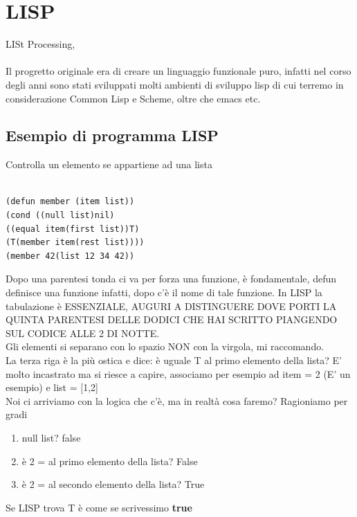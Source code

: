 \documentclass[12pt, a4paper, openany, oneside]{book}
\begin{document}
{\section{LISP}
LISt Processing, \\ \\
Il progretto originale era di creare un linguaggio funzionale puro, infatti
nel corso degli anni sono stati sviluppati molti ambienti di sviluppo lisp
di cui terremo in considerazione Common Lisp e Scheme, oltre che emacs etc.
\subsection{Esempio di programma LISP}
Controlla un elemento se appartiene ad una lista \\ \\
\begin{lstlisting}[language=LISP]
(defun member (item list)) 
(cond ((null list)nil) 
((equal item(first list))T) 
(T(member item(rest list)))) 
(member 42(list 12 34 42))
\end{lstlisting}
Dopo una parentesi tonda ci va per forza una funzione, è fondamentale, defun 
definisce una funzione infatti, dopo c'è il nome di tale funzione. In LISP la 
tabulazione è ESSENZIALE, AUGURI A DISTINGUERE DOVE PORTI LA QUINTA PARENTESI DELLE 
DODICI CHE HAI SCRITTO PIANGENDO SUL CODICE ALLE 2 DI NOTTE.
\\
Gli elementi si separano con lo spazio NON con la virgola, mi raccomando.
\\
La terza riga è la più ostica e dice: è uguale T al primo elemento della lista?
E' molto incastrato ma si riesce a capire, associamo per esempio ad item = 2
(E' un esempio) e list = [1,2] \\
Noi ci arriviamo con la logica che c'è, ma in realtà cosa faremo? Ragioniamo 
per gradi
\begin{enumerate}
	\item null list? \color{magenta} false \color{black}
	\item è 2 = al primo elemento della lista? \color{magenta} False \color{black}
	\item è 2 = al secondo elemento della lista? \color{blue}True \color{black}
\end{enumerate}
Se LISP trova T è come se scrivessimo  \color{blue}\textbf{true}\color{black}
}
\end{document}

